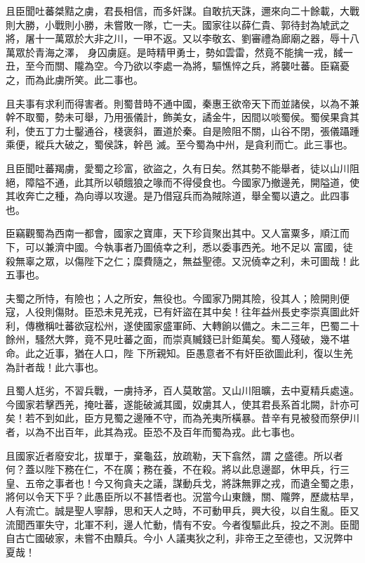 \begin{pinyinscope}
 且臣聞吐蕃桀黠之虜，君長相信，而多奸謀。自敢抗天誅，邇來向二十餘載，大戰則大勝，小戰則小勝，未嘗敗一隊，亡一夫。國家往以薛仁貴、郭待封為虓武之將，屠十一萬眾於大非之川，一甲不返。又以李敬玄、劉審禮為廊廟之器，辱十八萬眾於青海之澤，
 身囚虜庭。是時精甲勇士，勢如雲雷，然竟不能擒一戎，馘一丑，至今而關、隴為空。今乃欲以李處一為將，驅憔悴之兵，將襲吐蕃。臣竊憂之，而為此虜所笑。此二事也。



 且夫事有求利而得害者。則蜀昔時不通中國，秦惠王欲帝天下而並諸侯，以為不兼幹不取蜀，勢未可舉，乃用張儀計，飾美女，譎金牛，因間以啖蜀侯。蜀侯果貪其利，使五丁力士鑿通谷，棧褒斜，置道於秦。自是險阻不關，山谷不閉，張儀躡踵乘便，縱兵大破之，蜀侯誅，幹邑
 滅。至今蜀為中州，是貪利而亡。此三事也。



 且臣聞吐蕃羯虜，愛蜀之珍富，欲盜之，久有日矣。然其勢不能舉者，徒以山川阻絕，障隘不通，此其所以頓餓狼之喙而不得侵食也。今國家乃撤邊羌，開隘道，使其收奔亡之種，為向導以攻邊。是乃借寇兵而為賊除道，舉全蜀以遺之。此四事也。



 臣竊觀蜀為西南一都會，國家之寶庫，天下珍貨聚出其中。又人富粟多，順江而下，可以兼濟中國。今執事者乃圖僥幸之利，悉以委事西羌。地不足以
 富國，徒殺無辜之眾，以傷陛下之仁；糜費隨之，無益聖德。又況僥幸之利，未可圖哉！此五事也。



 夫蜀之所恃，有險也；人之所安，無役也。今國家乃開其險，役其人；險開則便寇，人役則傷財。臣恐未見羌戎，已有奸盜在其中矣！往年益州長史李崇真圖此奸利，傳檄稱吐蕃欲寇松州，遂使國家盛軍師、大轉餉以備之。未二三年，巴蜀二十餘州，騷然大弊，竟不見吐蕃之面，而崇真贓錢已計鉅萬矣。蜀人殘破，幾不堪命。此之近事，猶在人口，陛
 下所親知。臣愚意者不有奸臣欲圖此利，復以生羌為計者哉！此六事也。



 且蜀人尪劣，不習兵戰，一虜持矛，百人莫敢當。又山川阻曠，去中夏精兵處遠。今國家若擊西羌，掩吐蕃，遂能破滅其國，奴虜其人，使其君長系首北闕，計亦可矣！若不到如此，臣方見蜀之邊陲不守，而為羌夷所橫暴。昔辛有見被發而祭伊川者，以為不出百年，此其為戎。臣恐不及百年而蜀為戎。此七事也。



 且國家近者廢安北，拔單于，棄龜茲，放疏勒，天下翕然，謂
 之盛德。所以者何？蓋以陛下務在仁，不在廣；務在養，不在殺。將以此息邊鄙，休甲兵，行三皇、五帝之事者也！今又徇貪夫之議，謀動兵戈，將誅無罪之戎，而遺全蜀之患，將何以令天下乎？此愚臣所以不甚悟者也。況當今山東饑，關、隴弊，歷歲枯旱，人有流亡。誠是聖人寧靜，思和天人之時，不可動甲兵，興大役，以自生亂。臣又流聞西軍失守，北軍不利，邊人忙動，情有不安。今者復驅此兵，投之不測。臣聞自古亡國破家，未嘗不由黷兵。今小
 人議夷狄之利，非帝王之至德也，又況弊中夏哉！




\end{pinyinscope}
